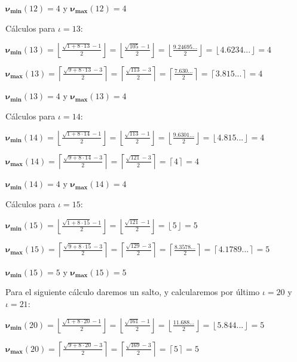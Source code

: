 \documentclass{amsart}
\theoremstyle{definition}
\theoremstyle{remark}
\numberwithin{equation}{section}
\newcommand{\monrel}[1]{\mathbf{#1}}
\newcommand{\funct}[1]{\monrel{#1}}
\newcommand{\functat}[2]{\funct{#1}{\left({#2}\right)}}
\begin{document}
$\functat{{\nu}_{\min}}{12} = 4$ y $\functat{{\nu}_{\max}}{12} = 4$


Cálculos para $\iota = 13$:


$\functat{{\nu}_{\min}}{13} =
\left\lfloor\frac{\sqrt{1+8 \cdot 13}-1}{2}\right\rfloor =
\left\lfloor\frac{\sqrt{105}-1}{2}\right\rfloor =
\left\lfloor\frac{9.24695...}{2}\right\rfloor =
\left\lfloor{4.6234...}\right\rfloor = 4
$


$\functat{{\nu}_{\max}}{13} =
\left\lceil\frac{\sqrt{9+8\cdot 13}-3}{2}\right\rceil =
\left\lceil\frac{\sqrt{113}-3}{2}\right\rceil =
\left\lceil\frac{7.630...}{2}\right\rceil =
\left\lceil{3.815...}\right\rceil = 4
$


$\functat{{\nu}_{\min}}{13} = 4$ y $\functat{{\nu}_{\max}}{13} = 4$


Cálculos para $\iota = 14$:


$\functat{{\nu}_{\min}}{14} =
\left\lfloor\frac{\sqrt{1+8 \cdot 14}-1}{2}\right\rfloor =
\left\lfloor\frac{\sqrt{113}-1}{2}\right\rfloor =
\left\lfloor\frac{9.6301...}{2}\right\rfloor =
\left\lfloor{4.815...}\right\rfloor = 4
$


$\functat{{\nu}_{\max}}{14} =
\left\lceil\frac{\sqrt{9+8\cdot 14}-3}{2}\right\rceil =
\left\lceil\frac{\sqrt{121}-3}{2}\right\rceil =
\left\lceil{4}\right\rceil = 4
$


$\functat{{\nu}_{\min}}{14} = 4$ y $\functat{{\nu}_{\max}}{14} = 4$


Cálculos para $\iota = 15$:


$\functat{{\nu}_{\min}}{15} =
\left\lfloor\frac{\sqrt{1+8 \cdot 15}-1}{2}\right\rfloor =
\left\lfloor\frac{\sqrt{121}-1}{2}\right\rfloor =
\left\lfloor{5}\right\rfloor = 5
$


$\functat{{\nu}_{\max}}{15} =
\left\lceil\frac{\sqrt{9+8\cdot 15}-3}{2}\right\rceil =
\left\lceil\frac{\sqrt{129}-3}{2}\right\rceil =
\left\lceil\frac{8.3578...}{2}\right\rceil =
\left\lceil{4.1789...}\right\rceil = 5
$


$\functat{{\nu}_{\min}}{15} = 5$ y $\functat{{\nu}_{\max}}{15} = 5$


	Para el siguiente cálculo daremos un salto, y calcularemos por último $\iota = 20$ y $\iota = 21$:


$\functat{{\nu}_{\min}}{20} =
\left\lfloor\frac{\sqrt{1+8 \cdot 20}-1}{2}\right\rfloor =
\left\lfloor\frac{\sqrt{161}-1}{2}\right\rfloor =
\left\lfloor\frac{11.688...}{2}\right\rfloor =
\left\lfloor{5.844...}\right\rfloor = 5
$


$\functat{{\nu}_{\max}}{20} =
\left\lceil\frac{\sqrt{9+8\cdot 20}-3}{2}\right\rceil =
\left\lceil\frac{\sqrt{169}-3}{2}\right\rceil =
\left\lceil{5}\right\rceil = 5
$
\end{document}
